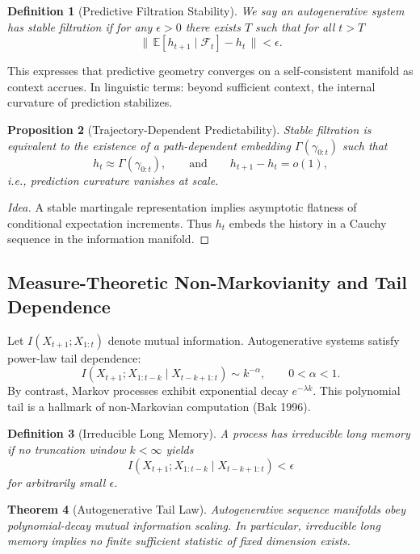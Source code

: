 \documentclass[12pt,a4paper,twoside,openright]{book}
\newtheorem{theorem}{Theorem}
\newtheorem{proposition}[theorem]{Proposition}
\newtheorem{definition}[theorem]{Definition}
\begin{document}
\begin{definition}[Predictive Filtration Stability]
We say an autogenerative system has \emph{stable filtration} if for any $\epsilon>0$ there exists $T$ such that for all $t > T$
\[
\|\,\mathbb{E}[h_{t+1}\mid \mathcal{F}_t] - h_t\,\| < \epsilon.
\]
\end{definition}
This expresses that predictive geometry converges on a self-consistent manifold as context accrues.
In linguistic terms: beyond sufficient context, the internal curvature of prediction stabilizes.

\begin{proposition}[Trajectory-Dependent Predictability]
Stable filtration is equivalent to the existence of a path-dependent embedding $\Gamma(\gamma_{0:t})$ such that
\[
h_t \approx \Gamma(\gamma_{0:t}),\qquad\text{and}\qquad h_{t+1} - h_t = o(1),
\]
i.e., prediction curvature vanishes at scale.
\end{proposition}

\begin{proof}[Idea]
A stable martingale representation implies asymptotic flatness of conditional expectation increments.
Thus $h_t$ embeds the history in a Cauchy sequence in the information manifold.
\end{proof}

\subsection{Measure-Theoretic Non-Markovianity and Tail Dependence}
Let $I(X_{t+1};X_{1:t})$ denote mutual information.
Autogenerative systems satisfy power-law tail dependence:
\[
I(X_{t+1}; X_{1:t-k} \mid X_{t-k+1:t}) \sim k^{-\alpha},\qquad 0<\alpha<1.
\]
By contrast, Markov processes exhibit exponential decay $e^{-\lambda k}$.
This polynomial tail is a hallmark of non-Markovian computation (Bak 1996).

\begin{definition}[Irreducible Long Memory]
A process has irreducible long memory if no truncation window $k < \infty$ yields
\[
I(X_{t+1}; X_{1:t-k} \mid X_{t-k+1:t}) < \epsilon
\]
for arbitrarily small $\epsilon$.
\end{definition}

\begin{theorem}[Autogenerative Tail Law]
Autogenerative sequence manifolds obey polynomial-decay mutual information scaling.
In particular, irreducible long memory implies \emph{no finite sufficient statistic of fixed dimension exists}.
\end{theorem}
\end{document}

